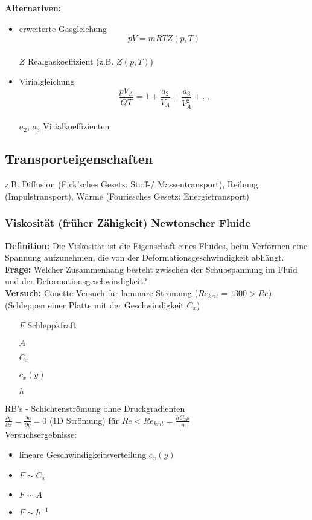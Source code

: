 \documentclass[10pt,a4paper]{article}
\begin{document}
\textbf{Alternativen:}
\begin{itemize}
\item erweiterte Gasgleichung \\
\[p V = m R T Z(p, T)\] \\
$Z$ Realgaskoeffizient (z.B. $Z(p, T)$)
\item Virialgleichung \\
\[\frac{p V_A}{Q T} = 1 + \frac{a_2}{V_A} + \frac{a_3}{V_A^2} + \dots\] \\
$a_2$, $a_3$ Virialkoeffizienten
\end{itemize}

\subsection{Transporteigenschaften}

z.B. Diffusion (Fick'sches Gesetz: Stoff-/ Massentransport), Reibung (Impulstransport), Wärme (Fouriesches Gesetz: Energietransport)

\subsubsection{Viskosität (früher Zähigkeit) Newtonscher Fluide}

\textbf{Definition:} Die Viskosität ist die Eigenschaft eines Fluides, beim Verformen eine Spannung aufzunehmen, die von der Deformationsgeschwindigkeit abhängt. \\
\textbf{Frage:} Welcher Zusammenhang besteht zwischen der Schubspannung im Fluid und der Deformationsgeschwindigkeit? \\
\textbf{Versuch:} Couette-Versuch für laminare Strömung ($Re_{krit} = 1300 > Re$) \\
(Schleppen einer Platte mit der Geschwindigkeit $C_x$)

\begin{itemize}
\item[$F$] Schleppkfraft
\item[$A$]
\item[$C_x$]
\item[$c_x(y)$]
\item[$h$]
\end{itemize}
RB's - Schichtenströmung ohne Druckgradienten \\
$\frac{\partial p}{\partial x} = \frac{\partial p}{\partial y} = 0$ (1D Strömung) für $Re < Re_{krit} = \frac{h C_x \rho}{\eta}$ \\
Versuchsergebnisse:
\begin{itemize}
\item lineare Geschwindigkeitsverteilung $c_x(y)$
\item $F \sim C_x$
\item $F \sim A$
\item $F \sim h^{-1}$
\end{itemize}
\end{document}
